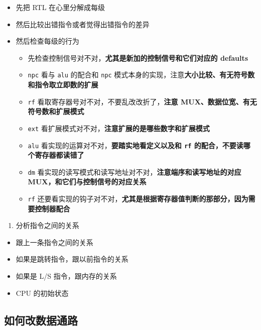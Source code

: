 \documentclass[12pt,AutoFakeBold]{article}
\providecommand{\tightlist}{%
  \setlength{\itemsep}{0pt}\setlength{\parskip}{0pt}}
\begin{document}
\begin{itemize}
\tightlist
\item
  先把 RTL 在心里分解成每级
\item
  然后比较出错指令或者觉得出错指令的差异
\item
  然后检查每级的行为

  \begin{itemize}
  \tightlist
  \item
    先检查控制信号对不对，\textbf{尤其是新加的控制信号和它们对应的
    defaults}
  \item
    \texttt{npc} 看与 \texttt{alu} 的配合和 \texttt{npc}
    模式本身的实现，注意\textbf{大小比较、有无符号数和指令取立即数的扩展}
  \item
    \texttt{rf} 看取寄存器号对不对，不要乱改改折了，\textbf{注意
    MUX、数据位宽、有无符号数和扩展模式}
  \item
    \texttt{ext}
    看扩展模式对不对，\textbf{注意扩展的是哪些数字和扩展模式}
  \item
    \texttt{alu} 看实现的运算对不对，\textbf{要踏实地看定义以及和
    \texttt{rf} 的配合，不要读哪个寄存器都读错了}
  \item
    \texttt{dm}
    看实现的读写模式和读写地址对不对，\textbf{注意端序和读写地址的对应
    MUX，和它们与控制信号的对应关系}
  \item
    \texttt{rf}
    还要看实现的钩子对不对，\textbf{尤其是根据寄存器值判断的那部分，因为需要控制器配合}
  \end{itemize}
\end{itemize}

\begin{enumerate}
\def\labelenumi{\arabic{enumi}.}
\setcounter{enumi}{2}
\tightlist
\item
  分析指令之间的关系
\end{enumerate}

\begin{itemize}
\tightlist
\item
  跟上一条指令之间的关系
\item
  如果是跳转指令，跟以前指令的关系
\item
  如果是 L/S 指令，跟内存的关系
\item
  CPU 的初始状态
\end{itemize}

\hypertarget{ux5982ux4f55ux6539ux6570ux636eux901aux8def}{%
\subsection{如何改数据通路}\label{ux5982ux4f55ux6539ux6570ux636eux901aux8def}}
\end{document}
